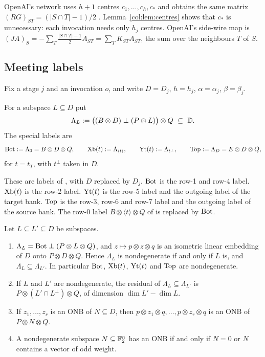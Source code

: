 \begin{remark}\label{col:rem:centres}
OpenAI's network uses $h+1$ centres $c_1,\dots,c_h,c_*$ and obtains the same matrix
$(RG)_{ST}=(|S\cap T|-1)/2$ \cite[\S2.1 and proof of Lemma~2.1]{oai}. Lemma~\ref{col:lem:centres} shows
that $c_*$ is unnecessary: each invocation needs only $h_j$ centres. OpenAI's side-wire map is
$(JA)_S=-\sum_{T}\frac{|S\cap T|-1}{2}A_{ST}=\sum_{T}K_{ST}A_{ST}$, the sum over the neighbours $T$
of $S$.
\end{remark}

\subsection{Meeting labels}\label{col:sec:labels}

Fix a stage $j$ and an invocation $o$, and write $D=D_j$, $h=h_j$, $\alpha=\alpha_j$, $\beta=\beta_j$.

\begin{definition}\label{col:def:lambda}
For a subspace $L\subseteq D$ put
\[
  \Lambda_L:=\big((B\otimes D)\perp(P\otimes L)\big)\otimes Q\ \subseteq\ \mathbb{D} .
\]
The special labels are
\[
  \mathrm{Bot}:=\Lambda_0=B\otimes D\otimes Q,\qquad \mathrm{Xb}(t):=\Lambda_{\langle t\rangle},\qquad
  \mathrm{Yt}(t):=\Lambda_{t^\perp},\qquad \mathrm{Top}:=\Lambda_D=E\otimes D\otimes Q,
\]
for $t=t_T$, with $t^\perp$ taken in $D$.
\end{definition}

These are labels of \cite[(2.7)]{oai}, with $D$ replaced by $D_j$. $\mathrm{Bot}$ is the row-1 and row-4
label. $\mathrm{Xb}(t)$ is the row-2 label. $\mathrm{Yt}(t)$ is the row-5 label and the outgoing label of the
target bank. $\mathrm{Top}$ is the row-3, row-6 and row-7 label and the outgoing label of the source bank.
The row-0 label $B\otimes\langle t\rangle\otimes Q$ of \cite{oai} is replaced by $\mathrm{Bot}$.

\begin{lemma}\label{col:lem:lambda}
Let $L\subseteq L'\subseteq D$ be subspaces.
\begin{enumerate}
\item[(i)] $\Lambda_L=\mathrm{Bot}\perp(P\otimes L\otimes Q)$, and $z\mapsto p\otimes z\otimes q$ is an
  isometric linear embedding of $D$ onto $P\otimes D\otimes Q$. Hence $\Lambda_L$ is nondegenerate if and
  only if $L$ is, and $\Lambda_L\subseteq\Lambda_{L'}$. In particular $\mathrm{Bot}$, $\mathrm{Xb}(t)$, $\mathrm{Yt}(t)$
  and $\mathrm{Top}$ are nondegenerate.
\item[(ii)] If $L$ and $L'$ are nondegenerate, the residual of $\Lambda_L\subseteq\Lambda_{L'}$ is
  $P\otimes(L'\cap L^\perp)\otimes Q$, of dimension $\dim L'-\dim L$.
\item[(iii)] If $z_1,\dots,z_r$ is an ONB of $N\subseteq D$, then $p\otimes z_1\otimes q,\dots,p\otimes z_r\otimes q$
  is an ONB of $P\otimes N\otimes Q$.
\item[(iv)] \cite[end of \S2.3]{oai} A nondegenerate subspace $N\subseteq\mathbb{F}_2^n$ has an ONB if and only if
  $N=0$ or $N$ contains a vector of odd weight.
\end{enumerate}
\end{lemma}

